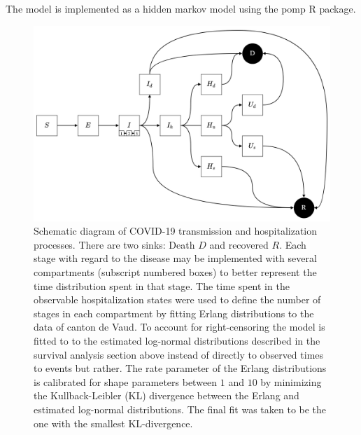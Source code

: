 The model is implemented as a hidden markov model using the pomp R package\cite[-8\baselineskip]{King:StatisticalInferencePartially:2015}. 
 \begin{figure}[!htb]
\begin{center}
\includegraphics{fig_covid-switzerland-npi/fig_supp/diagram.png}
\caption[Schematic diagram of COVID-19 transmission and hospitalization processes.]{Schematic diagram of COVID-19 transmission and hospitalization processes. There are two sinks: Death $D$ and recovered $R$. Each stage with regard to the disease may be implemented with several compartments (subscript numbered boxes) to better represent the time distribution spent in that stage. The time spent in the observable hospitalization states were used to define the number of stages in each compartment by fitting Erlang distributions to the data of canton de Vaud. To account for right-censoring the model is fitted to to the estimated log-normal distributions described in the survival analysis section above instead of directly to observed times to events but rather. The rate parameter of the Erlang distributions is calibrated for shape parameters between $1$ and $10$ by minimizing the Kullback-Leibler (KL) divergence between the Erlang and estimated log-normal distributions. The final fit was taken to be the one with the smallest KL-divergence.}
\label{fig:covid-ch-diagram}
\end{center}
\end{figure}
